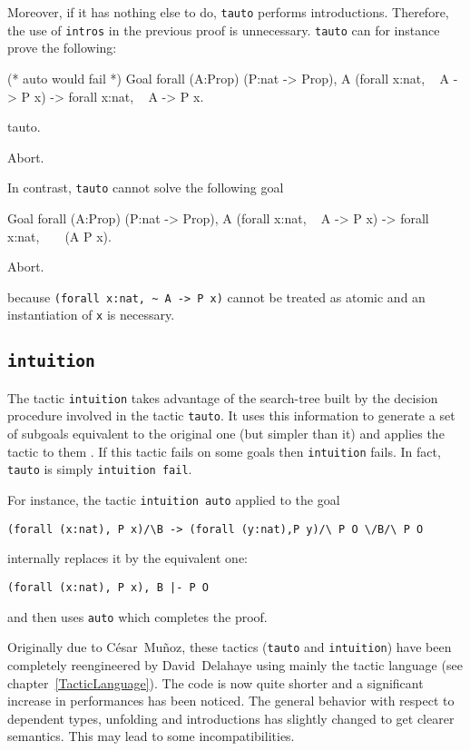 Moreover, if it has nothing else to do, {\tt tauto} performs
introductions. Therefore, the use of {\tt intros} in the previous
proof is unnecessary. {\tt tauto} can for instance prove the
following:
\begin{coq_example}
(* auto would fail *)
Goal forall (A:Prop) (P:nat -> Prop),
    A \/ (forall x:nat, ~ A -> P x) -> forall x:nat, ~ A -> P x.

  tauto.
\end{coq_example}
\begin{coq_eval}
Abort.
\end{coq_eval}

\Rem In contrast, {\tt tauto} cannot solve the following goal

\begin{coq_example*}
Goal forall (A:Prop) (P:nat -> Prop),
    A \/ (forall x:nat, ~ A -> P x) -> forall x:nat, ~ ~ (A \/ P x).
\end{coq_example*}
\begin{coq_eval}
Abort.
\end{coq_eval}

because \verb=(forall x:nat, ~ A -> P x)= cannot be treated as atomic and an
instantiation of \verb=x= is necessary.

\subsection{\tt intuition {\tac}
\label{intuition}}

The tactic \texttt{intuition} takes advantage of the search-tree built
by the decision procedure involved in the tactic {\tt tauto}. It uses
this information to generate a set of subgoals equivalent to the
original one (but simpler than it) and applies the tactic 
{\tac} to them \cite{Mun94}. If this tactic fails on some goals then
{\tt intuition} fails. In fact, {\tt tauto} is simply {\tt intuition
  fail}.

For instance, the tactic {\tt intuition auto} applied to the goal
\begin{verbatim}
(forall (x:nat), P x)/\B -> (forall (y:nat),P y)/\ P O \/B/\ P O
\end{verbatim}
internally replaces it by the equivalent one:
\begin{verbatim}
(forall (x:nat), P x), B |- P O
\end{verbatim}
and then uses {\tt auto} which completes the proof.

Originally due to C{\'e}sar~Mu{\~n}oz, these tactics ({\tt tauto} and {\tt intuition})
have been completely reengineered by David~Delahaye using mainly the tactic
language (see chapter~\ref{TacticLanguage}). The code is now quite shorter and
a significant increase in performances has been noticed. The general behavior
with respect to dependent types, unfolding and introductions has
slightly changed to get clearer semantics. This may lead to some
incompatibilities.

